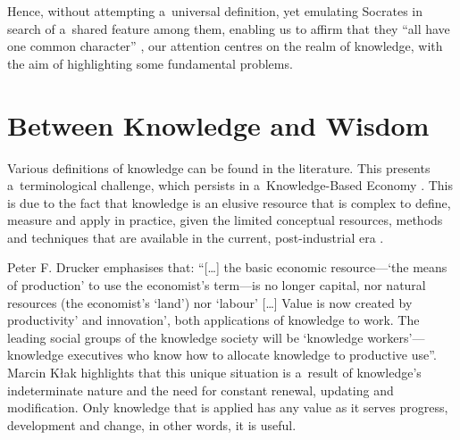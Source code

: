 Hence, without attempting a~universal definition, yet emulating Socrates in search of a~shared feature among them, enabling us to affirm that they ``all have one common character'' 
\parencite[][]{}, %
 our attention centres on the realm of knowledge, with the aim of highlighting some fundamental problems.



\section{Between Knowledge and Wisdom}

Various definitions of knowledge can be found in the literature. This presents a~terminological challenge, which persists in a~Knowledge-Based Economy 
\parencites[][]{teece_knowledge_1987}[][]{}. %
 This is due to the fact that knowledge is an elusive resource that is complex to define, measure and apply in practice, given the limited conceptual resources, methods and techniques that are available in the current, post-industrial era 
\parencite[][p.20]{strojny_zarzadzanie_2000}.%




Peter F. Drucker 
\parencite*[][p.7]{drucker_post-capitalist_2013} %
 emphasises that: ``[…] the basic economic resource---‘the means of production' to use the economist's term---is no longer capital, nor natural resources (the economist's ‘land') nor ‘labour' […] Value is now created by productivity' and innovation', both applications of knowledge to work. The leading social groups of the knowledge society will be ‘knowledge workers'---knowledge executives who know how to allocate knowledge to productive use''. Marcin Kłak 
\parencite*[][p.42]{klak_zarzadzanie_2010} %
 highlights that this unique situation is a~result of knowledge's indeterminate nature and the need for constant renewal, updating and modification. Only knowledge that is applied has any value as it serves progress, development and change, in other words, it is useful.



